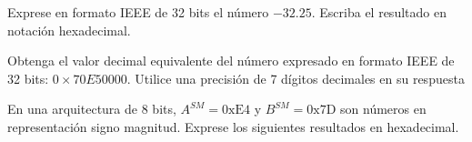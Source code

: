 \documentclass[addpoints]{exam}
\begin{document}
\begin{questions}



\question[2] Exprese en formato IEEE de 32 bits el número
$-32.25$. Escriba el resultado en notación hexadecimal. %
\droptotalpoints


\question[2] Obtenga el valor decimal equivalente del número expresado en
formato  IEEE de 32 bits: $0 \times 70E50000$. Utilice una precisión de 7
dígitos decimales en su respuesta%
\droptotalpoints

\question En una arquitectura de 8 bits, $A^{SM}=\mathrm{0xE4}$ y
  $B^{SM}=\mathrm{0x7D}$ son números en representación signo magnitud. Exprese
  los siguientes resultados en hexadecimal.
\end{questions}
\end{document}
